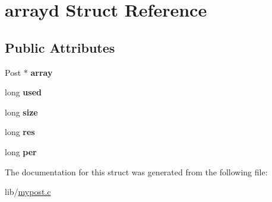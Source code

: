 \hypertarget{structarrayd}{}\section{arrayd Struct Reference}
\label{structarrayd}
\subsection*{Public Attributes}
\begin{DoxyCompactItemize}
\item 
Post $\ast$ {\bfseries array}\hypertarget{structarrayd_a3910603430a073ecbda589dd2a238ca6}{}\label{structarrayd_a3910603430a073ecbda589dd2a238ca6}

\item 
long {\bfseries used}\hypertarget{structarrayd_a0dfc8a8e91a318beff11fbed6c8b1d29}{}\label{structarrayd_a0dfc8a8e91a318beff11fbed6c8b1d29}

\item 
long {\bfseries size}\hypertarget{structarrayd_ae4e9730ae4d0e45afa341644eff6f4d2}{}\label{structarrayd_ae4e9730ae4d0e45afa341644eff6f4d2}

\item 
long {\bfseries res}\hypertarget{structarrayd_aaf8038f3334c07bf90bf4f0858b27605}{}\label{structarrayd_aaf8038f3334c07bf90bf4f0858b27605}

\item 
long {\bfseries per}\hypertarget{structarrayd_ac95ef34a26b4246fdf4f0ef5c0e79008}{}\label{structarrayd_ac95ef34a26b4246fdf4f0ef5c0e79008}

\end{DoxyCompactItemize}


The documentation for this struct was generated from the following file\+:\begin{DoxyCompactItemize}
\item 
lib/\hyperlink{mypost_8c}{mypost.\+c}\end{DoxyCompactItemize}
